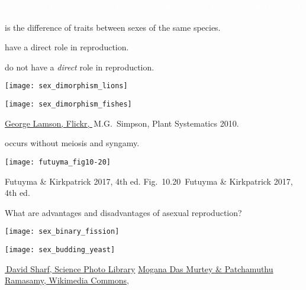 \documentclass[t]{beamer}
\newcommand{\futuyma}[1]{%
	\ifthenelse{\isempty{#1}}%
	{Futuyma \& Kirkpatrick 2017, 4th ed.}%
	{Fig.~#1~Futuyma \& Kirkpatrick 2017, 4th ed.}%
}
\newcommand{\backskip}{\vspace{-0.5\baselineskip}}
\begin{document}

{
\begin{frame}[b]

\tinyfill  \textcolor{white}{\futuyma{}}
\end{frame}
}

\begin{frame}{ is the difference of  traits between sexes of the same species.}

\backskip

\begin{multicols}{2}

\hangpara {} have a direct role in  reproduction.

\hangpara {} do not have a \emph{direct} role in reproduction.

\vspace{\baselineskip}

\centering

\texttt{[image: sex\_dimorphism\_lions]}

\columnbreak

\texttt{[image: sex\_dimorphism\_fishes]}


\end{multicols}


\vfilll

\tiny \href{https://www.flickr.com/photos/11847703@N05/8234519412}{George Lamson, Flickr, } \hfill
\textcopyright\,M.G.~Simpson, Plant Systematics 2010.
\end{frame}


\begin{frame}{ occurs without meiosis and syngamy.}

\texttt{[image: futuyma\_fig10-20]}

\tinyfill \futuyma{10.20}

\end{frame}



\begin{frame}{What are advantages and disadvantages of asexual reproduction?}

\begin{multicols}{2}

\texttt{[image: sex\_binary\_fission]}

\columnbreak

\texttt{[image: sex\_budding\_yeast]}
\end{multicols}

\vfilll

\tiny \href{https://www.sciencephoto.com/media/11784/view/dividing-bacterium-sem}{\textcopyright\,David Sharf, Science Photo Library} \hfill \href{https://commons.wikimedia.org/wiki/File:Saccharomyces_cerevisiae_SEM.jpg}{Mogana Das Murtey \& Patchamuthu Ramasamy, Wikimedia Commons, }


\end{frame}
\end{document}
